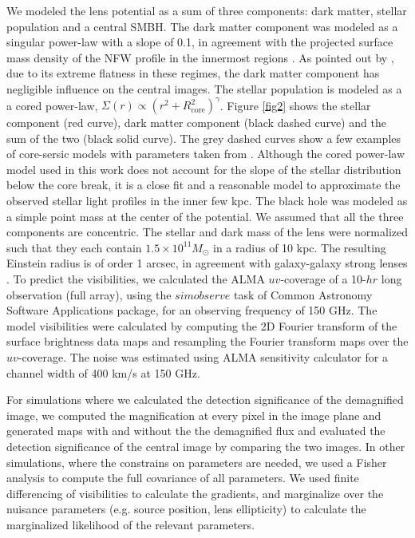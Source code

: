 \documentclass[chicago]{emulateapj}
\begin{document}
We modeled the lens potential as a sum of three components: dark matter, stellar population and a central SMBH. The dark matter component was modeled as a singular power-law with a slope of 0.1, in agreement with the projected surface mass density of the NFW profile in the innermost regions \citep{Golse:02}. As  pointed out by \citet{Keeton:03}, due to its extreme flatness in these regimes, the dark matter component has negligible influence on the central images. 
The stellar population is modeled as a a cored power-law, $\Sigma(r)\propto (r^2+R_{\mathrm{core}}^2)^{\gamma}$. Figure \ref{fig2} shows the stellar component (red curve), dark matter component (black dashed curve) and the sum of the two (black solid curve). The grey dashed curves show a few examples of core-sersic models with parameters taken from \citet{Ferrarese:06}. Although the cored power-law model used in this work does not account for the slope of the stellar distribution below the core break, it is a close fit and a reasonable model to approximate the observed stellar light profiles in the inner few kpc. 
The black hole was modeled as a simple point mass at the center of the potential. We assumed that all the three components are concentric.
The stellar and dark mass of the lens were normalized such that they each contain $1.5\times10^{11} M_{\odot}$ in a radius of 10 kpc. The resulting Einstein radius is of order 1 arcsec, in agreement with galaxy-galaxy strong lenses \citep[e.g.,][]{hezaveh:13b}.
To predict the visibilities, we calculated the ALMA $uv$-coverage of a 10-$hr$ long observation (full array), using the $simobserve$ task of Common Astronomy Software Applications package, for an observing frequency of 150 GHz. 
The model visibilities were calculated by computing the 2D Fourier transform of the surface brightness data maps and resampling the Fourier transform maps over the $uv$-coverage. 
The noise was estimated using ALMA sensitivity calculator for a channel width of 400 km/s at 150 GHz. 


For simulations where we calculated the detection significance of the demagnified image, we computed the magnification at every pixel in the image plane and generated maps with and without the the demagnified flux and evaluated the detection significance of the central image by comparing the two images. In other simulations, where the constrains on parameters are needed, we used a Fisher analysis to compute the full covariance of all parameters. 
We used finite differencing of visibilities to calculate the gradients, and marginalize over the nuisance parameters (e.g. source position, lens ellipticity) to calculate the marginalized likelihood of the relevant parameters. 
\end{document}
